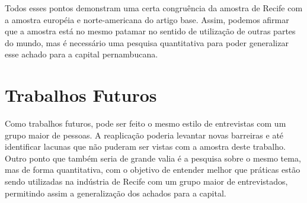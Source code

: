Todos esses pontos demonstram uma certa congruência da amostra de Recife com a amostra européia e norte-americana do artigo base. Assim, podemos afirmar que a amostra está no mesmo patamar no sentido de utilização de outras partes do mundo, mas é necessário uma pesquisa quantitativa para poder generalizar esse achado para a capital pernambucana. 

\section{Trabalhos Futuros}

Como trabalhos futuros, pode ser feito o mesmo estilo de entrevistas com um grupo maior de pessoas. A reaplicação poderia levantar novas barreiras e até identificar lacunas que não puderam ser vistas com a amostra deste trabalho. Outro ponto que também seria de grande valia é a pesquisa sobre o mesmo tema, mas de forma quantitativa, com o objetivo de entender melhor que práticas estão sendo utilizadas na indústria de Recife com um grupo maior de entrevistados, permitindo assim a generalização dos achados para a capital. 
